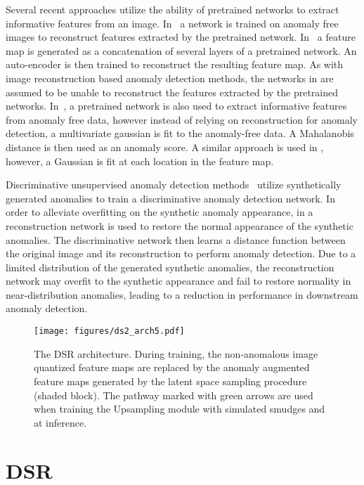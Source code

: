 \documentclass[runningheads]{llncs}
\begin{document}
Several recent approaches utilize the ability of pretrained networks to extract informative features from an image. In~\cite{bergmann2020uninformed} a network is trained on anomaly free images to reconstruct features extracted by the pretrained network. In~\cite{featspace1} a feature map is generated as a concatenation of several layers of a pretrained network. An auto-encoder is then trained to reconstruct the resulting feature map. As with image reconstruction based anomaly detection methods, the networks in \cite{bergmann2020uninformed,featspace1} are assumed to be unable to reconstruct the features extracted by the pretrained networks. In~\cite{featspace2}, a pretrained network is also used to extract informative features from anomaly free data, however instead of relying on reconstruction for anomaly detection, a multivariate gaussian is fit to the anomaly-free data. A Mahalanobis distance is then used as an anomaly score. A similar approach is used in \cite{defard2021padim}, however, a Gaussian is fit at each location in the feature map.

Discriminative unsupervised anomaly detection methods~\cite{zavrtanik2021draem,disc1,li2021cutpaste} utilize synthetically generated anomalies to train a discriminative anomaly detection network.  In order to alleviate overfitting on the synthetic anomaly appearance, in \cite{zavrtanik2021draem} a reconstruction network is used to restore the normal appearance of the synthetic anomalies. The discriminative network then learns a distance function between the original image and its reconstruction to perform anomaly detection. Due to a limited distribution of the generated synthetic anomalies, the reconstruction network may overfit to the synthetic appearance and fail to restore normality in near-distribution anomalies, leading to a reduction in performance in downstream anomaly detection.


\begin{figure*}[!htb]
\centering
  \texttt{[image: figures/ds2\_arch5.pdf]}
\caption{
The DSR architecture. During training, the non-anomalous image quantized feature maps  are replaced by the anomaly augmented feature maps  generated by the latent space sampling procedure (shaded block). The pathway marked with green arrows are used when training the Upsampling module with simulated smudges and at inference.
}
\label{fig:total_architecture}
\end{figure*}


\section{DSR}
\end{document}
